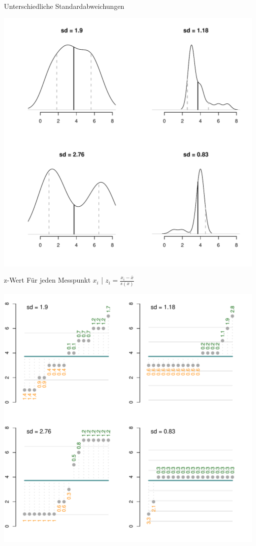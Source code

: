 \begin{frame}
  {Unterschiedliche Standardabweichungen}
  \begin{center}
    \includegraphics[height=0.9\textheight]{RVorlesung/stdevs}
  \end{center}
\end{frame}


\begin{frame}
  {z-Wert}\label{slide:z}
  Für jeden Messpunkt $x_i$ | \alert{$z_i=\frac{x_i-\bar{x}}{s(x)}$}\\
  \begin{center}
    \includegraphics[height=0.8\textheight]{RVorlesung/fourzs}
  \end{center}
\end{frame}

